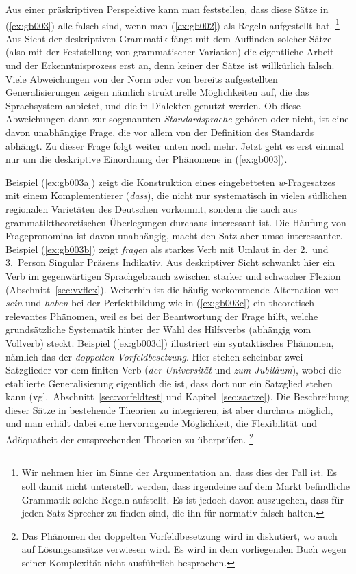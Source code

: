 Aus einer präskriptiven Perspektive kann man feststellen, dass diese Sätze in (\ref{ex:gb003}) alle falsch sind, wenn man (\ref{ex:gb002}) als Regeln aufgestellt hat.%
\footnote{Wir nehmen hier im Sinne der Argumentation an, dass dies der Fall ist.
Es soll damit nicht unterstellt werden, dass irgendeine auf dem Markt befindliche Grammatik solche Regeln aufstellt.
Es ist jedoch davon auszugehen, dass für jeden Satz Sprecher zu finden sind, die ihn für normativ falsch halten.}
Aus Sicht der deskriptiven Grammatik fängt mit dem Auffinden solcher Sätze (also mit der Feststellung von grammatischer Variation) die eigentliche Arbeit und der Erkenntnisprozess erst an, denn keiner der Sätze ist willkürlich falsch.
Viele Abweichungen von der Norm oder von bereits aufgestellten Generalisierungen zeigen nämlich strukturelle Möglichkeiten auf, die das Sprachsystem anbietet, und die \zB in Dialekten genutzt werden.
Ob diese Abweichungen dann zur sogenannten \textit{Standardsprache} gehören oder nicht, ist eine davon unabhängige Frage, die vor allem von der Definition des Standards abhängt.
Zu dieser Frage folgt weiter unten noch mehr.
Jetzt geht es erst einmal nur um die deskriptive Einordnung der Phänomene in (\ref{ex:gb003}).

Beispiel (\ref{ex:gb003a}) zeigt die Konstruktion eines eingebetteten \textit{w}-Fragesatzes mit einem Komplementierer (\textit{dass}), die nicht nur systematisch in vielen südlichen regionalen Varietäten des Deutschen vorkommt, sondern die auch aus grammatiktheoretischen Überlegungen durchaus interessant ist.
Die Häufung von Fragepronomina ist davon unabhängig, macht den Satz aber umso interessanter.
Beispiel (\ref{ex:gb003b}) zeigt \textit{fragen} als starkes Verb mit Umlaut in der 2.\ und 3.\ Person Singular Präsens Indikativ.
Aus deskriptiver Sicht schwankt hier ein Verb im gegenwärtigen Sprachgebrauch zwischen starker und schwacher Flexion (Abschnitt~\ref{sec:vvflex}).
Weiterhin ist die häufig vorkommende Alternation von \textit{sein} und \textit{haben} bei der Perfektbildung wie in (\ref{ex:gb003c}) ein theoretisch relevantes Phänomen, weil es bei der Beantwortung der Frage hilft, welche grundsätzliche Systematik hinter der Wahl des Hilfsverbs (abhängig vom Vollverb) steckt.
Beispiel (\ref{ex:gb003d}) illustriert ein syntaktisches Phänomen, nämlich das der \textit{doppelten Vorfeldbesetzung}.
Hier stehen scheinbar zwei Satzglieder vor dem finiten Verb (\textit{der Universität} und \textit{zum Jubiläum}), wobei die etablierte Generalisierung eigentlich die ist, dass dort nur ein Satzglied stehen kann (vgl.\ Abschnitt~\ref{sec:vorfeldtest} und Kapitel~\ref{sec:saetze}).
Die Beschreibung dieser Sätze in bestehende Theorien zu integrieren, ist aber durchaus möglich, und man erhält dabei eine hervorragende Möglichkeit, die Flexibilität und Adäquatheit der entsprechenden Theorien zu überprüfen.%
\footnote{Das Phänomen der doppelten Vorfeldbesetzung wird in \citet{Mueller03} diskutiert, wo auch auf Lösungsansätze verwiesen wird.
Es wird in dem vorliegenden Buch wegen seiner Komplexität nicht ausführlich besprochen.}

